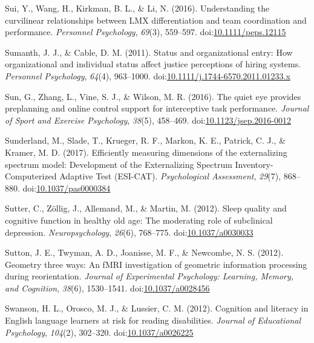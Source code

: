 \documentclass[english,man]{apa6}
\theoremstyle{definition}
\theoremstyle{definition}
\theoremstyle{definition}
\theoremstyle{remark}
\begin{document}
\hypertarget{ref-Sui2016}{}
Sui, Y., Wang, H., Kirkman, B. L., \& Li, N. (2016). Understanding the
curvilinear relationships between LMX differentiation and team
coordination and performance. \emph{Personnel Psychology}, \emph{69}(3),
559--597.
doi:\href{https://doi.org/10.1111/peps.12115}{10.1111/peps.12115}

\hypertarget{ref-Sumanth2011}{}
Sumanth, J. J., \& Cable, D. M. (2011). Status and organizational entry:
How organizational and individual status affect justice perceptions of
hiring systems. \emph{Personnel Psychology}, \emph{64}(4), 963--1000.
doi:\href{https://doi.org/10.1111/j.1744-6570.2011.01233.x}{10.1111/j.1744-6570.2011.01233.x}

\hypertarget{ref-Sun2016}{}
Sun, G., Zhang, L., Vine, S. J., \& Wilson, M. R. (2016). The quiet eye
provides preplanning and online control support for interceptive task
performance. \emph{Journal of Sport and Exercise Psychology},
\emph{38}(5), 458--469.
doi:\href{https://doi.org/10.1123/jsep.2016-0012}{10.1123/jsep.2016-0012}

\hypertarget{ref-Sunderland2017}{}
Sunderland, M., Slade, T., Krueger, R. F., Markon, K. E., Patrick, C.
J., \& Kramer, M. D. (2017). Efficiently measuring dimensions of the
externalizing spectrum model: Development of the Externalizing Spectrum
Inventory-Computerized Adaptive Test (ESI-CAT). \emph{Psychological
Assessment}, \emph{29}(7), 868--880.
doi:\href{https://doi.org/10.1037/pas0000384}{10.1037/pas0000384}

\hypertarget{ref-Sutter2012}{}
Sutter, C., Zöllig, J., Allemand, M., \& Martin, M. (2012). Sleep
quality and cognitive function in healthy old age: The moderating role
of subclinical depression. \emph{Neuropsychology}, \emph{26}(6),
768--775. doi:\href{https://doi.org/10.1037/a0030033}{10.1037/a0030033}

\hypertarget{ref-Sutton2012}{}
Sutton, J. E., Twyman, A. D., Joanisse, M. F., \& Newcombe, N. S.
(2012). Geometry three ways: An fMRI investigation of geometric
information processing during reorientation. \emph{Journal of
Experimental Psychology: Learning, Memory, and Cognition}, \emph{38}(6),
1530--1541.
doi:\href{https://doi.org/10.1037/a0028456}{10.1037/a0028456}

\hypertarget{ref-Swanson2012}{}
Swanson, H. L., Orosco, M. J., \& Lussier, C. M. (2012). Cognition and
literacy in English language learners at risk for reading disabilities.
\emph{Journal of Educational Psychology}, \emph{104}(2), 302--320.
doi:\href{https://doi.org/10.1037/a0026225}{10.1037/a0026225}
\end{document}
